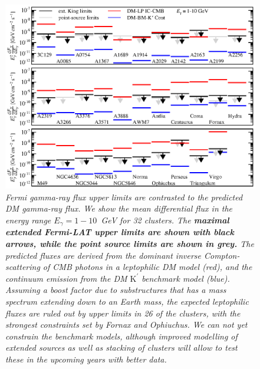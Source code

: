 \documentclass[10pt,aps,pra,reprint,amsmath,amsfonts,amssymb,showpacs,nofootinbib,floatfix]{revtex4-1}
\def\C#1{{\bf #1}}
\newcommand{\Fermi}{{\em Fermi}\xspace}
\newcommand{\rmn}{\mathrm}
\newcommand{\Kp}{\rmn{K}^\prime}
\begin{document}
\begin{figure}
\begin{minipage}{2.0\columnwidth}
  \includegraphics[width=0.99\columnwidth]{figures/Fermi.comp.DM.eps}
  \caption{\it \Fermi gamma-ray flux upper limits are contrasted to the
    predicted DM gamma-ray flux. We show the mean differential flux in
    the energy range $E_\gamma=1-10$~GeV for 32 clusters. The
    \C{maximal extended \Fermi-LAT upper limits are shown with black
      arrows, while the point source limits are shown in grey.} The
    predicted fluxes are derived from the dominant inverse
    Compton-scattering of CMB photons in a leptophilic DM model (red),
    and the continuum emission from the DM $\Kp$ benchmark model
    (blue). Assuming a boost factor due to substructures that has a
    mass spectrum extending down to an Earth mass, the expected
    leptophilic fluxes are ruled out by upper limits in 26 of the
    clusters, with the strongest constraints set by Fornax and
    Ophiuchus. We can not yet constrain the benchmark models,
    although improved modelling of extended sources as well as
    stacking of clusters will allow to test these in the upcoming
    years with better data.}
 \label{fig14}
\end{minipage}
\end{figure}
\end{document}
